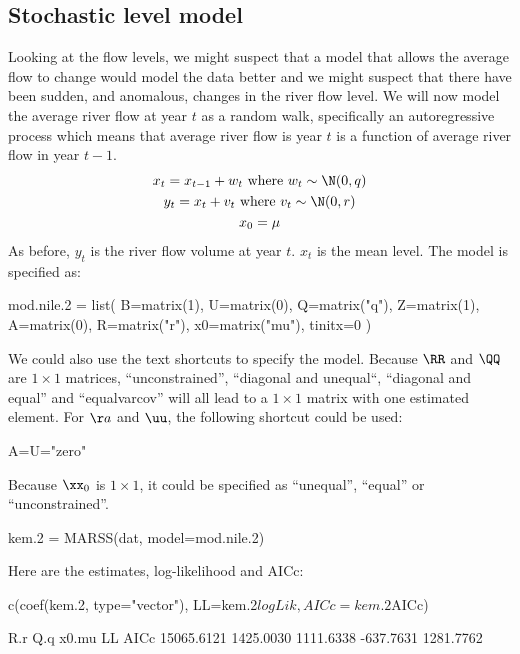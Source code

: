 \subsection{Stochastic level model}
Looking at the flow levels, we might suspect that a model that allows the average flow to change would model the data better and we might suspect that there have been sudden, and anomalous, changes in the river flow level.
We will now model the average river flow at year $t$ as a random walk, specifically an autoregressive process which means that average river flow is year $t$ is a function of average river flow in year $t-1$.  
\begin{equation}
\begin{gathered}
x_t = x_{t-1}+w_t \text{ where } w_t \sim \N(0,q) \\
y_t = x_t+v_t \text{ where } v_t \sim \N(0,r)  \\
x_0 = \mu
\end{gathered}   
\label{eq:random.walk.w.noise}\end{equation}
As before, $y_t$ is the river flow volume at year $t$. $x_t$ is the mean level.
The model is specified as:
\begin{Schunk}
\begin{Sinput}
 mod.nile.2 = list(
 B=matrix(1), U=matrix(0), Q=matrix("q"),
 Z=matrix(1), A=matrix(0), R=matrix("r"),
 x0=matrix("mu"), tinitx=0 )
\end{Sinput}
\end{Schunk}
We could also use the text shortcuts to specify the model.  Because $\RR$ and $\QQ$ are $1 \times 1$ matrices, ``unconstrained'', ``diagonal and unequal``, ``diagonal and equal'' and ``equalvarcov'' will all lead to a $1 \times 1$ matrix with one estimated element.  For $\aa$ and $\uu$, the following shortcut could be used:
\begin{Schunk}
\begin{Sinput}
 A=U="zero"
\end{Sinput}
\end{Schunk}
Because $\xx_0$ is $1 \times 1$, it could be specified as ``unequal'', ``equal'' or ``unconstrained''.

\begin{Schunk}
\begin{Sinput}
 kem.2 = MARSS(dat, model=mod.nile.2)
\end{Sinput}
\end{Schunk}
Here are the estimates, log-likelihood and AICc:
\begin{Schunk}
\begin{Sinput}
 c(coef(kem.2, type="vector"), LL=kem.2$logLik, AICc=kem.2$AICc)
\end{Sinput}
\begin{Soutput}
       R.r        Q.q      x0.mu         LL       AICc 
15065.6121  1425.0030  1111.6338  -637.7631  1281.7762 
\end{Soutput}
\end{Schunk}

